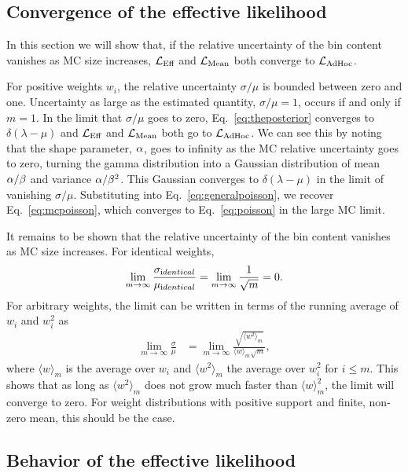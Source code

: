 \subsection{Convergence of the effective likelihood\label{sec:llhconvergence}}

In this section we will show that, if the relative uncertainty of the bin content vanishes as MC size increases, $\mathcal{L}_\textmd{Eff}$ and $\mathcal{L}_{\textmd{Mean}}$ both converge to $\mathcal{L}_{\textmd{AdHoc}}$. 

For positive weights $w_i$, the relative uncertainty $\sigma/\mu$ is bounded between zero and one. Uncertainty as large as the estimated quantity, $\sigma/\mu=1$, occurs if and only if $m=1$. In the limit that $\sigma/\mu$ goes to zero, Eq.~\eqref{eq:theposterior} converges to $\delta(\lambda - \mu)$ and $\mathcal{L}_\textmd{Eff}$ and $\mathcal{L}_{\textmd{Mean}}$ both go to $\mathcal{L}_{\textmd{AdHoc}}$. We can see this by noting that the shape parameter, $\alpha$, goes to infinity as the MC relative uncertainty goes to zero, turning the gamma distribution into a Gaussian distribution of mean $\alpha / \beta$ and variance $\alpha / \beta^2$. This Gaussian converges to $\delta(\lambda-\mu)$ in the limit of vanishing $\sigma/\mu$. Substituting into Eq.~\eqref{eq:generalpoisson}, we recover Eq.~\eqref{eq:mcpoisson}, which converges to Eq.~\eqref{eq:poisson} in the large MC limit.

It remains to be shown that the relative uncertainty of the bin content vanishes as MC size increases. For identical weights,
\begin{equation}
\lim_{m\to\infty} \frac{\sigma_{\textrm identical}}{\mu_{\textrm identical}} = \lim_{m\to\infty} \frac{1}{\sqrt{m}} = 0 .
\end{equation}
For arbitrary weights, the limit can be written in terms of the running average of $w_i$ and $w_i^2$ as
\begin{align}
\lim_{m\to\infty} \frac{\sigma}{\mu} &= \lim_{m\to\infty} \frac{\sqrt{\langle w^2 \rangle_m}}{\langle w\rangle_m\sqrt{m}},
\end{align}
where $\langle w \rangle_m$ is the average over $w_i$ and $\langle w^2 \rangle_m$ the average over $w_i^2$ for $i \leq m$. This shows that as long as $\langle w^2 \rangle_m$ does not grow much faster than $\langle w \rangle_m^2$, the limit will converge to zero. For weight distributions with positive support and finite, non-zero mean, this should be the case.

\subsection{Behavior of the effective likelihood\label{sec:llhbehavior}}

